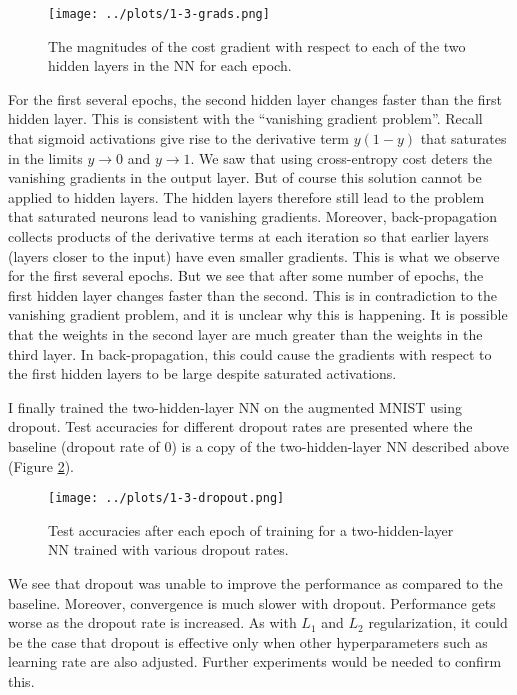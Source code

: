 \documentclass[11pt]{article}
\begin{document}
\begin{figure}
\centering
\texttt{[image: ../plots/1-3-grads.png]}
\caption{\label{fig-1-3-grads} The magnitudes of the cost gradient with respect to each of the two hidden layers in the NN for each epoch.}
\end{figure}

For the first several epochs, the second hidden layer changes faster than the first hidden layer. This is consistent with the ``vanishing gradient problem''. Recall that sigmoid activations give rise to the derivative term $y(1-y)$ that saturates in the limits $y\rightarrow 0$ and $y\rightarrow 1$. We saw that using cross-entropy cost deters the vanishing gradients in the output layer. But of course this solution cannot be applied to hidden layers. The hidden layers therefore still lead to the problem that saturated neurons lead to vanishing gradients. Moreover, back-propagation collects products of the derivative terms at each iteration so that earlier layers (layers closer to the input) have even smaller gradients. This is what we observe for the first several epochs. But we see that after some number of epochs, the first hidden layer changes faster than the second. This is in contradiction to the vanishing gradient problem, and it is unclear why this is happening. It is possible that the weights in the second layer are much greater than the weights in the third layer. In back-propagation, this could cause the gradients with respect to the first hidden layers to be large despite saturated activations.

I finally trained the two-hidden-layer NN on the augmented MNIST using dropout. Test accuracies for different dropout rates are presented where the baseline (dropout rate of $0$) is a copy of the two-hidden-layer NN described above (Figure \ref{fig-1-3-dropout}).

\begin{figure}
\centering
\texttt{[image: ../plots/1-3-dropout.png]}
\caption{\label{fig-1-3-dropout} Test accuracies after each epoch of training for a two-hidden-layer NN trained with various dropout rates.}
\end{figure}

We see that dropout was unable to  improve the performance as compared to the baseline. Moreover, convergence is much slower with dropout. Performance gets worse as the dropout rate is increased. As with $L_1$ and $L_2$ regularization, it could be the case that dropout is effective only when other hyperparameters such as learning rate are also adjusted. Further experiments would be needed to confirm this.
\end{document}
